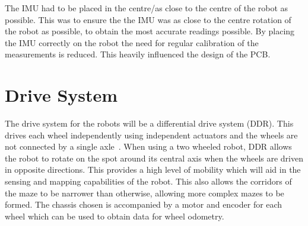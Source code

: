 The IMU had to be placed in the centre/as 
close to the centre of the robot as possible. This was to ensure the the 
IMU was as close to the centre rotation of the robot as possible, to 
obtain the most accurate readings possible. By placing the IMU correctly 
on the robot the need for regular calibration of the measurements is 
reduced. This heavily influenced the design of the PCB. 


\section{Drive System}\label{mech/drive}

The drive system for the robots will be a differential drive system (DDR).
This drives each wheel independently using independent actuators and the
wheels are not connected by a single axle~\cite[p.~146]{braunl_embedded_2013}.
When using a two wheeled robot, DDR allows the
robot to rotate on the spot around its central axis when the wheels 
are driven in opposite directions. This provides a high level of 
mobility which will aid in the sensing and mapping capabilities of 
the robot. This also allows the corridors of the maze to be narrower 
than otherwise, allowing more complex mazes to be formed. The 
chassis chosen is accompanied by a motor and encoder for each wheel 
which can be used to obtain data for wheel odometry. 
